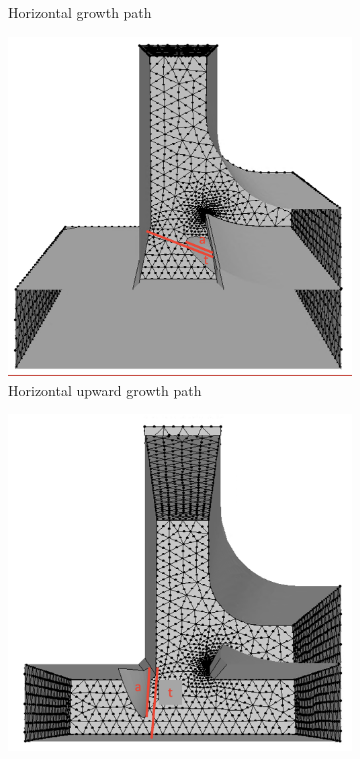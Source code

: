 \begin{figure}[h!]
\begin{subfigure}[b]{0.5\textwidth}
    \caption{Horizontal growth path}
    \label{fig:horizontal_growth2}
  \end{subfigure}
  \hfill
  \begin{subfigure}[b]{0.5\textwidth}
    \includegraphics[width=\textwidth]{upward_growth.png}
    \caption{Horizontal upward growth path}
    \label{fig:upward_growth}
  \end{subfigure}
  \hfill
  \begin{subfigure}[b]{0.5\textwidth}
    \includegraphics[width=\textwidth]{downward_growth.png}

\end{subfigure}
\end{figure}
